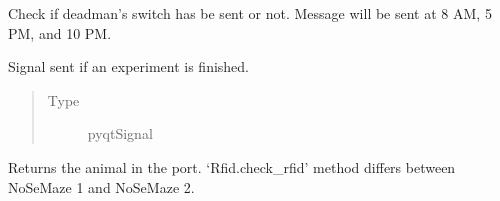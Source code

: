 \documentclass[letterpaper,10pt,english]{sphinxmanual}
\begin{document}
\begin{fulllineitems}
\begin{fulllineitems}
\end{fulllineitems}


\begin{fulllineitems}
\label{\detokenize{NoSeMazeController/Controllers:Controllers.ExperimentControl.ExperimentWorker.check_status}}
\pysigstartsignatures
{}
\pysigstopsignatures
\sphinxAtStartPar
Check if deadman’s switch has be sent or not. Message will be sent at
8 AM, 5 PM, and 10 PM.

\end{fulllineitems}


\begin{fulllineitems}
\label{\detokenize{NoSeMazeController/Controllers:Controllers.ExperimentControl.ExperimentWorker.finished}}
\pysigstartsignatures
{}
\pysigstopsignatures
\sphinxAtStartPar
Signal sent if an experiment is finished.
\begin{quote}\begin{description}
\item[{Type}] \leavevmode
\sphinxAtStartPar
pyqtSignal

\end{description}\end{quote}

\end{fulllineitems}


\begin{fulllineitems}
\label{\detokenize{NoSeMazeController/Controllers:Controllers.ExperimentControl.ExperimentWorker.get_present_animal}}
\pysigstartsignatures
{}
\pysigstopsignatures
\sphinxAtStartPar
Returns the animal in the port. ‘Rfid.check\_rfid’ method differs
between NoSeMaze 1 and NoSeMaze 2.


\end{fulllineitems}
\end{fulllineitems}
\end{document}
